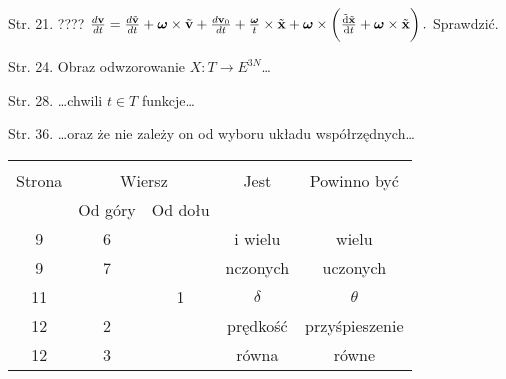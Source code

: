 \documentclass[a4paper,11pt]{article}
\begin{document}
Str. 21. ????
$\frac{ d\mathbf{v} }{ dt } = \frac{ d\tilde{ \mathbf{v} } }{ dt }
+ \boldsymbol{\omega} \times \tilde{ \mathbf{v} } + \frac{
  d\mathbf{v}_{ 0 } }{ dt } + \frac{ \boldsymbol{\omega} }{ t }
\times \tilde{ \mathbf{x} } + \boldsymbol{\omega}  \times \bigg(
\frac{ \tilde{ \mathrm{d} } \tilde{ \mathbf{x} } }{ \mathrm{d} t } +
\boldsymbol{\omega} \times \tilde{ \mathbf{x} } \bigg) \, .$
Sprawdzić.

Str. 24. Obraz odwzorowanie
$X : T \rightarrow E^{ 3N }$\ldots

Str. 28. \ldots chwili $t \in T$ funkcje\ldots

Str. 36. \ldots oraz że nie zależy on od wyboru układu
współrzędnych\ldots


\vspace{\spaceTwo}














\begin{center}

  \begin{tabular}{|c|c|c|c|c|}
    \hline
    & \multicolumn{2}{c|}{} & & \\
    Strona & \multicolumn{2}{c|}{Wiersz}
                            & Jest & Powinno być \\ \cline{2-3}
    & Od góry & Od dołu & & \\
    \hline
    9   &  6 & & i wielu & wielu \\
    9   &  7 & & nczonych & uczonych \\
    11  & &  1 & $\delta$ & $\theta$ \\
    12  &  2 & & prędkość & przyśpieszenie \\
    12  &  3 & & równa & równe \\
    \hline
  \end{tabular}

\end{center}
\end{document}
